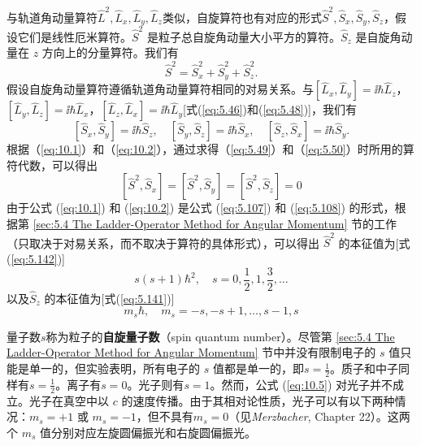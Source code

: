     与轨道角动量算符$\hat{L}^2, \hat{L}_x, \hat{L}_y, \hat{L}_z$类似，自旋算符也有对应的形式$\hat{S}^2, \hat{S}_x, \hat{S}_y, \hat{S}_z$，假设它们是线性厄米算符。$\hat{S}^2$ 是粒子总自旋角动量大小平方的算符。$\hat{S}_z$ 是自旋角动量在 $z$ 方向上的分量算符。我们有
    \begin{equation}
        \hat{S}^2 = \hat{S}_x^2 + \hat{S}_y^2 + \hat{S}_z^2.
        \label{eq:10.1}
    \end{equation}
    假设自旋角动量算符遵循轨道角动量算符相同的对易关系。与$\left[\hat{L}_x, \hat{L}_y\right] = \ii \hbar \hat{L}_z$，$\left[\hat{L}_y, \hat{L}_z\right] = \ii \hbar \hat{L}_x$，$\left[\hat{L}_z, \hat{L}_x\right] = \ii \hbar \hat{L}_y$[式(\ref{eq:5.46})和(\ref{eq:5.48})]，我们有
    \begin{equation}
        \left[\hat{S}_x, \hat{S}_y\right] = \ii \hbar \hat{S}_z, \quad
        \left[\hat{S}_y, \hat{S}_z\right] = \ii \hbar \hat{S}_x, \quad
        \left[\hat{S}_z, \hat{S}_x\right] = \ii \hbar \hat{S}_y.
        \label{eq:10.2}
    \end{equation}
    根据（\ref{eq:10.1}）和（\ref{eq:10.2}），通过求得（\ref{eq:5.49}）和（\ref{eq:5.50}）时所用的算符代数，可以得出
    \begin{equation}
        \left[\hat{S}^2, \hat{S}_x\right] = \left[\hat{S}^2, \hat{S}_y\right] = \left[\hat{S}^2, \hat{S}_z\right] = 0
        \label{eq:10.3}
    \end{equation}
    由于公式 (\ref{eq:10.1}) 和 (\ref{eq:10.2}) 是公式 (\ref{eq:5.107}) 和 (\ref{eq:5.108}) 的形式，根据第 \ref{sec:5.4 The Ladder-Operator Method for Angular Momentum} 节的工作（只取决于对易关系，而不取决于算符的具体形式），可以得出 $\hat{S}^2$ 的本征值为[式(\ref{eq:5.142})]
    \begin{equation}
        \boxed{
            s\left(s+1\right)\hbar^2, \quad s = 0, \frac{1}{2}, 1, \frac{3}{2}, \ldots
        }
        \label{eq:10.4}
    \end{equation}
    以及$\hat{S}_z$ 的本征值为[式(\ref{eq:5.141})]
    \begin{equation}
        \boxed{
            m_s\hbar, \quad m_s = -s, -s+1, \ldots, s-1, s
        }
        \label{eq:10.5}
    \end{equation}

    量子数$s$称为粒子的\textbf{自旋量子数}（spin quantum number）。尽管第 \ref{sec:5.4 The Ladder-Operator Method for Angular Momentum} 节中并没有限制电子的 $s$ 值只能是单一的，但实验表明，所有电子的 $s$ 值都是单一的，即$s = \frac{1}{2}$。质子和中子同样有$s = \frac{1}{2}$。离子有$s = 0$。光子则有$s=1$。然而，公式 (\ref{eq:10.5}) 对光子并不成立。光子在真空中以 $c$ 的速度传播。由于其相对论性质，光子可以有以下两种情况：$m_s = +1$ 或 $m_s = -1$，但不具有$m_s = 0$（见\textit{Merzbacher}, Chapter 22）。这两个 $m_s$ 值分别对应左旋圆偏振光和右旋圆偏振光。

